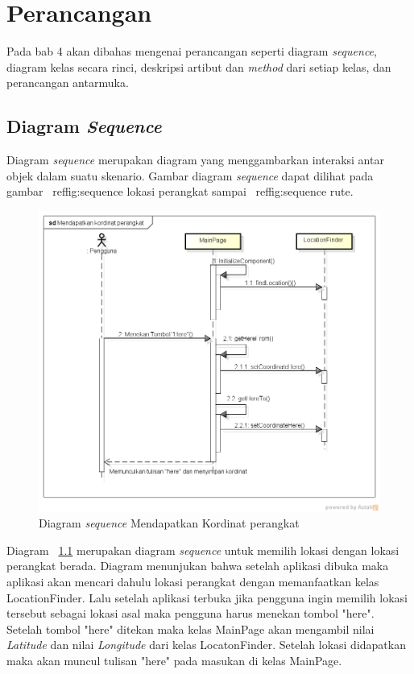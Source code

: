 \chapter{Perancangan}
\label{chap:Perancangan}

Pada bab 4 akan dibahas mengenai perancangan seperti diagram \textit{sequence}, diagram kelas secara rinci, deskripsi artibut dan \textit{method} dari setiap kelas, dan perancangan antarmuka.

\section{Diagram \textit{Sequence}}
\label{lab:Diagram Sequence}
\hspace{0.5cm} Diagram \textit{sequence} merupakan diagram yang menggambarkan interaksi antar objek dalam suatu skenario. Gambar diagram \textit{sequence} dapat dilihat pada gambar ~ref{fig:sequence lokasi perangkat} sampai ~ref{fig:sequence rute}. 

\begin{figure}[h]
	\centering
		\includegraphics[scale=0.4]{Gambar/sequence/MendapatkanKordinatPerangkat}
	\caption{Diagram \textit{sequence} Mendapatkan Kordinat perangkat}
	\label{fig:sequence lokasi perangkat}
\end{figure}

\hspace{0.5cm} Diagram ~\ref{fig:sequence lokasi perangkat} merupakan diagram \textit{sequence} untuk memilih lokasi dengan lokasi perangkat berada. Diagram menunjukan bahwa setelah aplikasi dibuka maka aplikasi akan mencari dahulu lokasi perangkat dengan memanfaatkan kelas LocationFinder. Lalu setelah aplikasi terbuka jika pengguna ingin memilih lokasi tersebut sebagai lokasi asal maka pengguna harus menekan tombol "here". Setelah tombol "here" ditekan maka kelas MainPage akan mengambil nilai \textit{Latitude} dan nilai \textit{Longitude} dari kelas LocatonFinder. Setelah lokasi didapatkan maka akan muncul tulisan "here" pada masukan di kelas MainPage.

